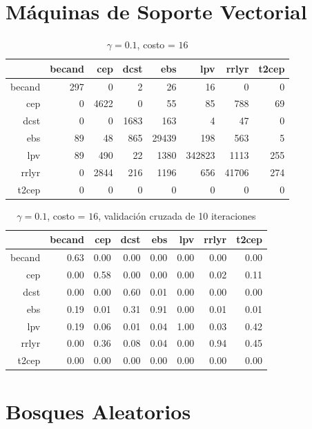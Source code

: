 \documentclass[letterpaper,12pt]{book}
\begin{document}
\section{Máquinas de Soporte Vectorial}

\begin{table}[ht]
\centering
\caption{$\gamma = 0.1$, costo = $16$} 
\label{table:cmSvm}
\begin{tabular}{rrrrrrrr}
  \hline
 & becand & cep & dcst & ebs & lpv & rrlyr & t2cep \\ 
  \hline
becand & 297 &   0 &   2 &  26 &  16 &   0 &   0 \\ 
  cep &   0 & 4622 &   0 &  55 &  85 & 788 &  69 \\ 
  dcst &   0 &   0 & 1683 & 163 &   4 &  47 &   0 \\ 
  ebs &  89 &  48 & 865 & 29439 & 198 & 563 &   5 \\ 
  lpv &  89 & 490 &  22 & 1380 & 342823 & 1113 & 255 \\ 
  rrlyr &   0 & 2844 & 216 & 1196 & 656 & 41706 & 274 \\ 
  t2cep &   0 &   0 &   0 &   0 &   0 &   0 &   0 \\ 
   \hline
\end{tabular}
\end{table}

\begin{table}[ht]
\centering
\caption{$\gamma = 0.1$, costo = $16$, validación cruzada de 10 iteraciones} 
\label{table:cmCvSvm}
\begin{tabular}{rrrrrrrr}
  \hline
 & becand & cep & dcst & ebs & lpv & rrlyr & t2cep \\ 
  \hline
becand & 0.63 & 0.00 & 0.00 & 0.00 & 0.00 & 0.00 & 0.00 \\ 
  cep & 0.00 & 0.58 & 0.00 & 0.00 & 0.00 & 0.02 & 0.11 \\ 
  dcst & 0.00 & 0.00 & 0.60 & 0.01 & 0.00 & 0.00 & 0.00 \\ 
  ebs & 0.19 & 0.01 & 0.31 & 0.91 & 0.00 & 0.01 & 0.01 \\ 
  lpv & 0.19 & 0.06 & 0.01 & 0.04 & 1.00 & 0.03 & 0.42 \\ 
  rrlyr & 0.00 & 0.36 & 0.08 & 0.04 & 0.00 & 0.94 & 0.45 \\ 
  t2cep & 0.00 & 0.00 & 0.00 & 0.00 & 0.00 & 0.00 & 0.00 \\ 
   \hline
\end{tabular}
\end{table}

\section{Bosques Aleatorios}
\end{document}
